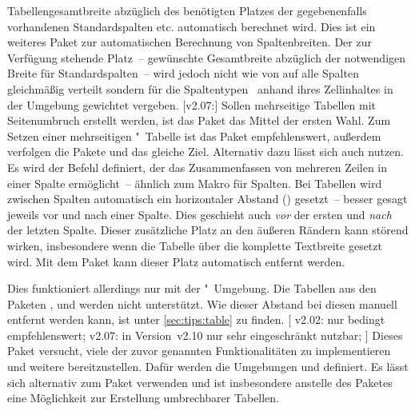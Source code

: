 \begin{DeclarePackages}
  Tabellengesamtbreite abzüglich des benötigten Platzes der gegebenenfalls 
  vorhandenen Standardspalten  etc. automatisch berechnet wird.
  Dies ist ein weiteres Paket zur automatischen Berechnung von Spaltenbreiten. 
  Der zur Verfügung stehende Platz~-- gewünschte Gesamtbreite abzüglich der 
  notwendigen Breite für Standardspalten~-- wird jedoch nicht wie von 
   auf alle Spalten gleichmäßig verteilt sondern für die 
  Spaltentypen~ anhand ihres Zellinhaltes in der Umgebung 
  gewichtet vergeben.
[v2.07:]
  Sollen mehrseitige Tabellen mit Seitenumbruch erstellt werden, ist das Paket
   das Mittel der ersten Wahl. Zum Setzen einer mehrseitigen 
  "~Tabelle ist das Paket  
  empfehlenswert, außerdem verfolgen die Pakete  und 
   das gleiche Ziel. Alternativ dazu lässt sich auch 
   nutzen.
  Es wird der Befehl  definiert, der das Zusammenfassen von 
  mehreren Zeilen in einer Spalte ermöglicht~-- ähnlich zum Makro 
   für Spalten.
  Bei Tabellen wird zwischen Spalten automatisch ein horizontaler Abstand 
  () gesetzt~-- besser gesagt jeweils vor und nach einer 
  Spalte. Dies geschieht auch \emph{vor} der ersten und \emph{nach} der letzten 
  Spalte. Dieser zusätzliche Platz an den äußeren Rändern kann störend wirken, 
  insbesondere wenn die Tabelle über die komplette Textbreite gesetzt wird. Mit 
  dem Paket  kann dieser Platz automatisch entfernt 
  werden.
  
  Dies funktioniert allerdings nur mit der "~Umgebung. 
  Die Tabellen aus den Paketen ,  und 
   werden nicht unterstützt. Wie dieser Abstand bei diesen 
  manuell entfernt werden kann, ist unter \autoref{sec:tips:table} zu finden.
[%
    v2.02: nur bedingt empfehlenswert;
    v2.07: in Version~v2.10 nur sehr eingeschränkt nutzbar;
  ]%
  Dieses Paket versucht, viele der zuvor genannten Funktionalitäten zu 
  implementieren und weitere bereitzustellen. Dafür werden die Umgebungen 
   und  definiert. Es lässt sich 
  alternativ zum Paket  verwenden und ist insbesondere 
  anstelle des Paketes  eine Möglichkeit zur Erstellung 
  umbrechbarer Tabellen.
  

\end{DeclarePackages}

